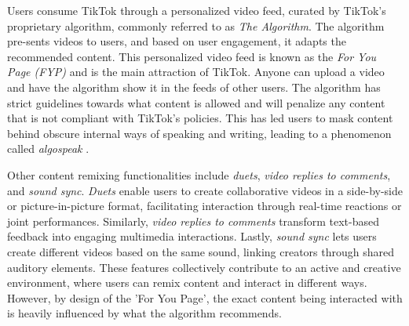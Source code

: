 Users consume TikTok through a personalized video feed, curated by TikTok's proprietary algorithm, commonly referred to as \textit{The Algorithm}. The algorithm pre-sents videos to users, and based on user engagement, it adapts the recommended content. This personalized video feed is known as the \textit{For You Page (FYP)} and is the main attraction of TikTok. Anyone can upload a video and have the algorithm show it in the feeds of other users. The algorithm has strict guidelines towards what content is allowed and will penalize any content that is not compliant with TikTok's policies. This has led users to mask content behind obscure internal ways of speaking and writing, leading to a phenomenon called \textit{algospeak} \citep{doi:10.1177/20563051231194586}. 


Other content remixing functionalities include \textit{duets}, \textit{video replies to comments}, and \textit{sound sync}. \textit{Duets} enable users to create collaborative videos in a side-by-side or picture-in-picture format, facilitating interaction through real-time reactions or joint performances. Similarly, \textit{video replies to comments} transform text-based feedback into engaging multimedia interactions. Lastly, \textit{sound sync} lets users create different videos based on the same sound, linking creators through shared auditory elements. These features collectively contribute to an active and creative environment, where users can remix content and interact in different ways. However, by design of the 'For You Page', the exact content being interacted with is heavily influenced by what the algorithm recommends.

